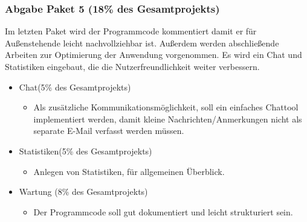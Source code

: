 \documentclass[11pt,a4paper]{report}
\begin{document}
\subsubsection{Abgabe Paket 5 (18\% des Gesamtprojekts)}
Im letzten Paket wird der Programmcode kommentiert damit er für Außenstehende leicht nachvollziehbar ist. Außerdem werden abschließende Arbeiten zur Optimierung der Anwendung vorgenommen. Es wird ein Chat und Statistiken eingebaut, die die Nutzerfreundlichkeit weiter verbessern. 
\begin{itemize}

\item
	Chat(5\% des Gesamtprojekts)
	
	\begin{itemize}
	\item
	Als zusätzliche Kommunikationsmöglichkeit, soll ein einfaches Chattool implementiert 		    werden, damit kleine Nachrichten/Anmerkungen nicht als separate E-Mail verfasst werden müssen. 
	\end{itemize}
	
	\item   
	Statistiken(5\% des Gesamtprojekts)
	 \begin{itemize}
	 \item
	 Anlegen von Statistiken, für allgemeinen Überblick.
	\end{itemize}
	\item
  Wartung (8\% des Gesamtprojekts)

  \begin{itemize}
  \item
    Der Programmcode soll gut dokumentiert und leicht strukturiert sein.
  \end{itemize}
	
\end{itemize}
\end{document}
